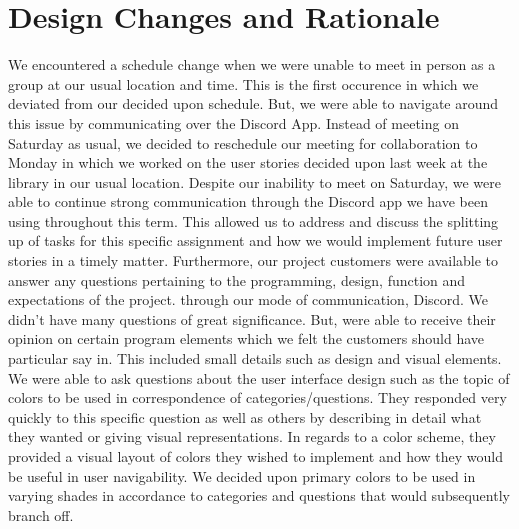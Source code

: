 \documentclass[12pt, letterpaper]{article}
\begin{document}
	\section{Design Changes and Rationale}
We encountered a schedule change when we were unable to meet in person as a group at our usual location and time.  This is the first occurence in which we deviated from our decided upon schedule.  But, we were able to navigate around this issue by communicating over the Discord App.  Instead of meeting on Saturday as usual, we decided to reschedule our meeting for collaboration to Monday in which we worked on the user stories decided upon last week at the library in our usual location.  Despite our inability to meet on Saturday, we were able to continue strong communication through the Discord app we have been using throughout this term.  This allowed us to address and discuss the splitting up of tasks for this specific assignment and how we would implement future user stories in a timely matter.  
Furthermore, our project customers were available to answer any questions pertaining to the programming, design, function and expectations of the project.  through our mode of communication, Discord.  We didn’t have many questions of great significance.  But, were able to receive their opinion on certain program elements which we felt the customers should have particular say in.  This included small details such as design and visual elements.  We were able to ask questions about the user interface design such as the topic of colors to be used in correspondence of categories/questions.  They responded very quickly to this specific question as well as others by describing in detail what they wanted or giving visual representations.  In regards to a color scheme, they provided a visual layout of colors they wished to implement and how they would be useful in user navigability.  We decided upon primary colors to be used in varying shades in accordance to categories and questions that would subsequently branch off.
\end{document}
